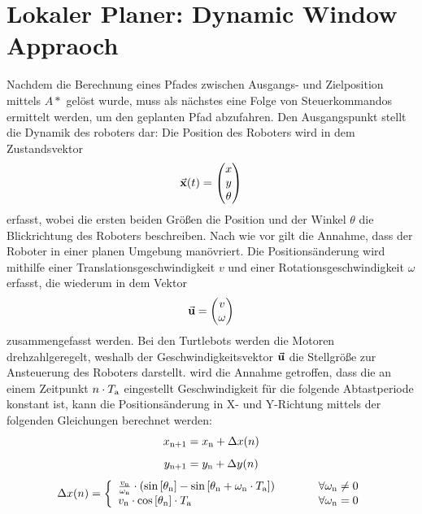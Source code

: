 \section{Lokaler Planer: Dynamic Window Appraoch}
Nachdem die Berechnung eines Pfades zwischen Ausgangs- und Zielposition mittels $A*$ gelöst wurde, muss als nächstes eine Folge von Steuerkommandos ermittelt werden, um den geplanten Pfad abzufahren. Den Ausgangspunkt stellt die Dynamik des roboters dar: Die Position des Roboters wird in dem Zustandsvektor 
\begin{equation}
\vec{\mathbf{x}}(t) = \begin{pmatrix}
x \\ y \\  \theta
\end{pmatrix}
\end{equation}
erfasst, wobei die ersten beiden Größen die Position und der Winkel $\theta$ die Blickrichtung des Roboters beschreiben. Nach wie vor gilt die Annahme, dass der Roboter in einer planen Umgebung manövriert. Die Positionsänderung wird mithilfe einer Translationsgeschwindigkeit $v$ und einer Rotationsgeschwindigkeit $\omega$ erfasst, die wiederum in dem Vektor
\begin{equation}
\vec{\mathbf{u}} = \begin{pmatrix}
v \\ \omega
\end{pmatrix}
\end{equation}
zusammengefasst werden. Bei den Turtlebots werden die Motoren drehzahlgeregelt, weshalb der Geschwindigkeitsvektor $\vec{\mathbf{u}}$ die Stellgröße zur Ansteuerung des Roboters darstellt. wird die Annahme getroffen, dass die an einem Zeitpunkt $n\cdot T_{\text{a}}$ eingestellt Geschwindigkeit für die folgende Abtastperiode konstant ist, kann die Positionsänderung in X- und Y-Richtung mittels der folgenden Gleichungen berechnet werden:
\begin{equation}
x_{\text{n+1}} = x_{\text{n}} + \Delta x(n)
\end{equation}
\begin{equation}
y_{\text{n+1}} = y_{\text{n}} + \Delta y(n)
\end{equation}
\begin{equation}
\Delta x(n) = \left\{ \begin{array}{ll}
\frac{v_{\text{n}}}{\omega_{\text{n}}}\cdot \left( \text{sin}\left[ {\theta_{\text{n}}} \right]-\text{sin}\left[ {\theta_{\text{n}}+\omega_{\text{n}}\cdot T_{\text{a}}} \right]\right) & \hspace{1cm} \forall \omega_{\text{n}} \neq 0 \\
v_{\text{n}}\cdot \text{cos}\left[ {\theta_{\text{n}}} \right]\cdot T_{\text{a}} & \hspace{1cm} \forall \omega_{\text{n}} = 0 \end{array}\right.
\end{equation}
